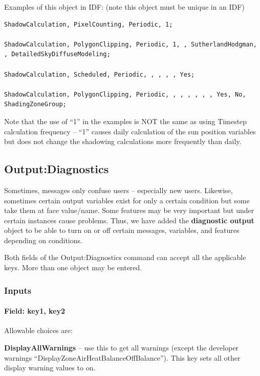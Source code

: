 Examples of this object in IDF: (note this object must be unique in an IDF)

\begin{lstlisting}
ShadowCalculation, PixelCounting, Periodic, 1;

ShadowCalculation, PolygonClipping, Periodic, 1, , SutherlandHodgman, , DetailedSkyDiffuseModeling;

ShadowCalculation, Scheduled, Periodic, , , , , Yes;

ShadowCalculation, PolygonClipping, Periodic, , , , , , , Yes, No, ShadingZoneGroup;
\end{lstlisting}

Note that the use of ``1'' in the examples is NOT the same as using Timestep calculation frequency -- ``1'' causes daily calculation of the sun position variables but does not change the shadowing calculations more frequently than daily.

\subsection{Output:Diagnostics}\label{outputdiagnostics}

Sometimes, messages only confuse users -- especially new users. Likewise, sometimes certain output variables exist for only a certain condition but some take them at face value/name. Some features may be very important but under certain instances cause problems. Thus, we have added the \textbf{diagnostic output} object to be able to turn on or off certain messages, variables, and features depending on conditions.

Both fields of the Output:Diagnostics command can accept all the applicable keys. More than one object may be entered.

\subsubsection{Inputs}\label{inputs-11-018}

\paragraph{Field: key1, key2}\label{field-key1-key2}

Allowable choices are:

\textbf{DisplayAllWarnings} -- use this to get all warnings (except the developer warnings ``DisplayZoneAirHeatBalanceOffBalance''). This key sets all other display warning values to on.

